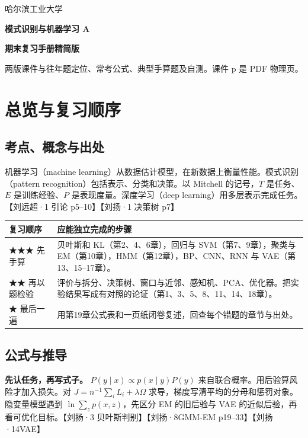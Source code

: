 \documentclass[UTF8,a4paper,zihao=-4,fontset=fandol]{ctexart}
\begin{document}
\vspace*{1.4em}
{\normalsize\color{muted}哈尔滨工业大学\par}
\vspace{.6em}
{\Huge\bfseries\color{navy}模式识别与机器学习 A\par}
\vspace{.32em}
{\huge\bfseries\color{navy}期末复习手册\quad 精简版\par}
\vspace{.68em}
{\small 两版课件与往年题定位、常考公式、典型手算题及自测。课件 p 是 PDF 物理页。\par}
\renewcommand{\contentsname}{目录}
\tableofcontents
\clearpage
\setcounter{section}{-1}

\section{总览与复习顺序}

\subsection{考点、概念与出处}
机器学习（machine learning）从数据估计模型，在新数据上衡量性能。模式识别（pattern recognition）包括表示、分类和决策。以 Mitchell 的记号，$T$ 是任务、$E$ 是训练经验、$P$ 是表现度量。深度学习（deep learning）用多层表示完成任务。【刘远超·1 引论 p5–10】【刘扬·1 决策树 p7】

\smallskip
\begin{tabularx}{\linewidth}{@{}p{.19\linewidth}X@{}}
\toprule
复习顺序 & 应能独立完成的步骤\\
\midrule
★★★ 先手算 & 贝叶斯和 KL（第2、4、6章），回归与 SVM（第7、9章），聚类与 EM（第10章），HMM（第12章），BP、CNN、RNN 与 VAE（第13、15–17章）。\\
★★ 再以题检验 & 评价与拆分、决策树、窗口与近邻、感知机、PCA、优化器。把实验结果写成有对照的论证（第1、3、5、8、11、14、18章）。\\
★ 最后一遍 & 用第19章公式表和一页纸闭卷复述，回查每个错题的章节与出处。\\
\bottomrule
\end{tabularx}

\subsection{公式与推导}
\textbf{先认任务，再写式子。} $P(y\mid x)\propto p(x\mid y)P(y)$ 来自联合概率。用后验算风险才加入损失。对 $J=n^{-1}\sum_iL_i+\lambda\Omega$ 求导，梯度写清平均的分母和惩罚对象。隐变量模型遇到 $\ln\sum_z p(x,z)$，先区分 EM 的旧后验与 VAE 的近似后验，再看可优化目标。【刘扬·3 贝叶斯判别】【刘扬·8GMM-EM p19–33】【刘扬·14VAE】
\end{document}
